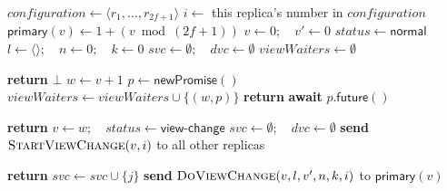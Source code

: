 \begin{algorithm}[!tb]
  \caption{Viewstamped Replication: Starting a View Change}
  \label{vr-start-view-change}
  \begin{algorithmic}[1]
    \State $\mathit{configuration}\gets\langle r_1,\ldots,r_{2f+1}\rangle$
    \State $i\gets$ this replica's number in $\mathit{configuration}$
    \State $\mathsf{primary}(v)\gets 1+(v\bmod(2f+1))$
    \State $v\gets 0;\quad v'\gets 0$
    \State $\mathit{status}\gets\mathsf{normal}$
    \State $l\gets\langle\rangle;\quad n\gets 0;\quad k\gets 0$
    \State $\mathit{svc}\gets\emptyset;\quad\mathit{dvc}\gets\emptyset$
    \State $\mathit{viewWaiters}\gets\emptyset$

      \State \textbf{return} $\bot$
    \EndIf
    \State $w\gets v+1$
    \State $p\gets\mathsf{newPromise}()$
    \State $\mathit{viewWaiters}\gets
      \mathit{viewWaiters}\cup\{(w,p)\}$
    \State {}
    \State \textbf{return} \textbf{await} $p.\mathsf{future}()$
  \EndProcedure

        \State \textbf{return}
      \EndIf
      \State $v\gets w;\quad\mathit{status}\gets\mathsf{view\mbox{-}change}$
      \State $\mathit{svc}\gets\emptyset;\quad\mathit{dvc}\gets\emptyset$
      \State \textbf{send} $\textsc{StartViewChange}(v,i)$
        to all other replicas
    \EndProcedure

        \State \textbf{return}
      \EndIf
        \State {}
      \EndIf
       
        \State $\mathit{svc}\gets\mathit{svc}\cup\{j\}$
          \State \textbf{send}
            $\textsc{DoViewChange}(v,l,v',n,k,i)$
            to $\mathsf{primary}(v)$
        \EndIf
      \EndIf
    \EndProcedure
  \end{algorithmic}
\end{algorithm}

